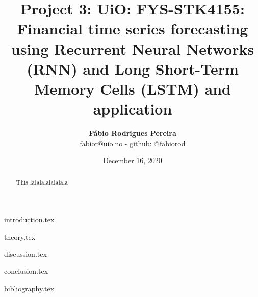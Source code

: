 \documentclass{article}
\title{Project 3: UiO: FYS-STK4155: Financial time series forecasting using Recurrent Neural Networks (RNN) and Long Short-Term Memory Cells (LSTM) and application}
\author{\textbf{Fábio Rodrigues Pereira} \\ \small fabior@uio.no - github: @fabiorod}
\date{December 16, 2020}
\begin{document}
\maketitle
\begin{abstract}
\noindent This lalalalalalalala
\end{abstract}

\bigskip

\tableofcontents

\clearpage
\thispagestyle{empty}

{introduction.tex}

\clearpage
\thispagestyle{empty}

{theory.tex}

\clearpage
\thispagestyle{empty}

{discussion.tex}

\clearpage
\thispagestyle{empty}

{conclusion.tex}

\clearpage
\thispagestyle{empty}

{bibliography.tex}
\end{document}
